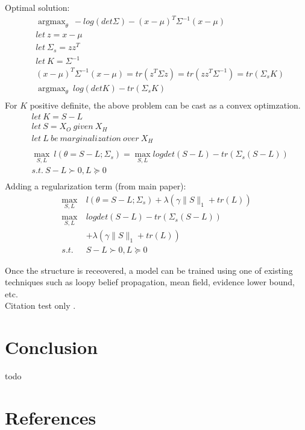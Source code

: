\documentclass[10pt,conference]{IEEEtran}
\DeclareMathOperator*{\argmax}{argmax}
\begin{document}
Optimal solution:
\begin{align*}
  & \argmax_{\theta}\ -log(det \Sigma) - (x-\mu)^T \Sigma^{-1}(x-\mu)\\
  &let\ z= x-\mu\\
  &let\ \Sigma_{s}= zz^T\\
  &let\ K = \Sigma^{-1}\\
  &(x-\mu)^T \Sigma^{-1}(x-\mu) = tr(z^T \Sigma z) = tr(zz^T \Sigma^{-1}) = tr(\Sigma_{s} K)\\
  & \argmax_{\theta}\ log(det K) - tr(\Sigma_{s} K)\\
\end{align*}
For $K$ positive definite, the above problem can be cast as a convex optimzation.
\begin{align*}
  &let\ K=S-L\\
  &let\ S = X_O\ given\ X_H\\
  &let\ L\ be\ marginalization\ over\ X_H\\
  \\
  &\max_{S,L}\ l(\theta=S-L; \Sigma_{s}) = \max_{S,L} log det(S-L) - tr(\Sigma_{s}(S-L))\\
  &s.t.\ S-L \succ 0, L \succeq 0\\
\end{align*}
Adding a regularization term (from main paper):\\
\begin{align*}
  \max_{S,L}\ & l(\theta=S-L; \Sigma_{s}) + \lambda(\gamma \|S\|_1 + tr(L))\\
  \max_{S,L}\ & log det(S-L) - tr(\Sigma_{s}(S-L))\\
              & + \lambda(\gamma \|S\|_1 + tr(L))\\
              s.t.\ & S-L \succ 0, L \succeq 0
\end{align*}
\vfill\null

\pagebreak

Once the structure is receovered, a model can be trained using one of existing techniques such as loopy belief propagation, mean field, evidence lower bound, etc.\\

Citation test only \cite{Chandra_1}.

\vfill\null

\pagebreak

\section*{Conclusion}
todo
\vfill\null

\pagebreak

\section*{References}
\printbibliography[heading=none]
\end{document}
